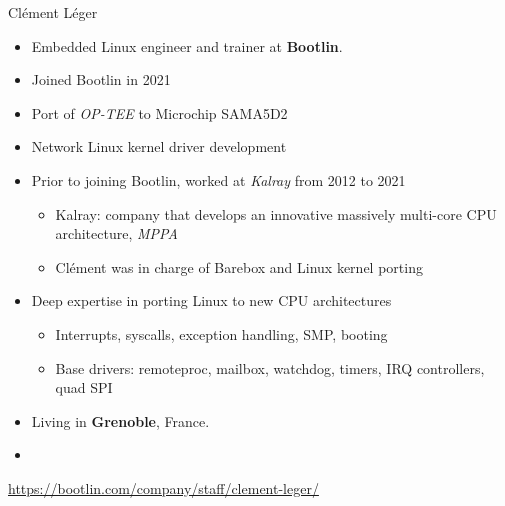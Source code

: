 \begin{frame}{Clément Léger}
  \begin{itemize}
  \item Embedded Linux engineer and trainer at {\bf Bootlin}.
  \item Joined Bootlin in 2021
  \item Port of {\em OP-TEE} to Microchip SAMA5D2
  \item Network Linux kernel driver development
  \item Prior to joining Bootlin, worked at {\em Kalray} from 2012 to
    2021
    \begin{itemize}
    \item Kalray: company that develops an innovative
      massively multi-core CPU architecture, {\em MPPA}
    \item Clément was in charge of Barebox and Linux kernel porting
    \end{itemize}
  \item Deep expertise in porting Linux to new CPU architectures
    \begin{itemize}
    \item Interrupts, syscalls, exception handling, SMP, booting
    \item Base drivers: remoteproc, mailbox, watchdog, timers, IRQ
      controllers, quad SPI
    \end{itemize}
  \item Living in {\bf Grenoble}, France.
  \item {}
  \end{itemize}
  {\small \url{https://bootlin.com/company/staff/clement-leger/}}
\end{frame}

